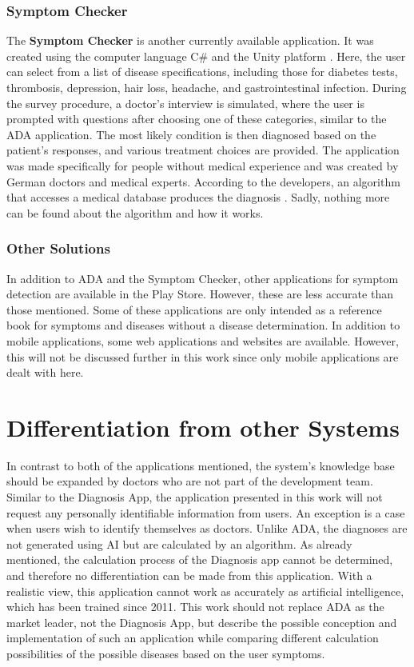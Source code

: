 \subsubsection{Symptom Checker} 
The \textbf{Symptom Checker} is another currently available application. It was created using the computer language C\# and the Unity platform \cite{.symptomchecker}. Here, the user can select from a list of disease specifications, including those for diabetes tests, thrombosis, depression, hair loss, headache, and gastrointestinal infection. During the survey procedure, a doctor's interview is simulated, where the user is prompted with questions after choosing one of these categories, similar to the ADA application. The most likely condition is then diagnosed based on the patient's responses, and various treatment choices are provided. The application was made specifically for people without medical experience and was created by German doctors and medical experts. According to the developers, an algorithm that accesses a medical database produces the diagnosis \cite{.symptomchecker}. Sadly, nothing more can be found about the algorithm and how it works. 

\subsubsection{Other Solutions}
In addition to ADA and the Symptom Checker, other applications for symptom detection are available in the Play Store. However, these are less accurate than those mentioned. Some of these applications are only intended as a reference book for symptoms and diseases without a disease determination. In addition to mobile applications, some web applications and websites are available. However, this will not be discussed further in this work since only mobile applications are dealt with here.

\section{Differentiation from other Systems}
In contrast to both of the applications mentioned, the system's knowledge base should be expanded by doctors who are not part of the development team. Similar to the Diagnosis App, the application presented in this work will not request any personally identifiable information from users. An exception is a case when users wish to identify themselves as doctors. Unlike ADA, the diagnoses are not generated using AI but are calculated by an algorithm. As already mentioned, the calculation process of the Diagnosis app cannot be determined, and therefore no differentiation can be made from this application. With a realistic view, this application cannot work as accurately as artificial intelligence, which has been trained since 2011. This work should not replace ADA as the market leader, not the Diagnosis App, but describe the possible conception and implementation of such an application while comparing different calculation possibilities of the possible diseases based on the user symptoms.




